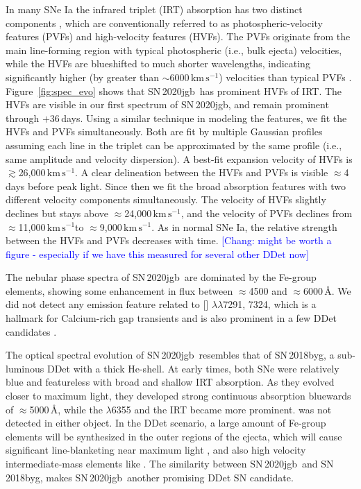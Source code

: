 \documentclass[twocolumn]{aastex631}
\newcommand{\sn}{SN\,2020jgb}
\newcommand{\kms}{$\mathrm{km}\,\mathrm{s}^{-1}$}
\newcommand{\chang}[1]{\textcolor{blue}{[Chang: #1]}}
\begin{document}
In many SNe Ia the  infrared triplet (IRT) absorption has two distinct components \citep{Mazzali_2005}, which are conventionally referred to as photospheric-velocity features (PVFs) and high-velocity features (HVFs). The PVFs originate from the main line-forming region with typical photospheric (i.e., bulk ejecta) velocities, while the HVFs are blueshifted to much shorter wavelengths, indicating significantly higher (by greater than $\sim$6000\,\kms) velocities than typical PVFs \citep{Silverman_HVF_2015}. Figure~\ref{fig:spec_evo} shows that \sn\ has prominent HVFs of  IRT. The HVFs are visible in our first spectrum of \sn, and remain prominent through $+36$\,days. Using a similar technique in modeling the  features, we fit the HVFs and PVFs simultaneously. Both are fit by multiple Gaussian profiles assuming each line in the triplet can be approximated by the same profile (i.e., same amplitude and velocity dispersion). A best-fit expansion velocity of HVFs is $\gtrsim$26,000\,\kms. A clear delineation between the HVFs and PVFs is visible $\approx$4\,days before peak light. Since then we fit the broad absorption features with two different velocity components simultaneously. The velocity of HVFs slightly declines but stays above $\approx$24,000\,\kms, and the velocity of PVFs declines from $\approx$11,000\,\kms to $\approx$9,000\,\kms. As in normal SNe Ia, the relative strength between the HVFs and PVFs decreases with time. \chang{might be worth a figure - especially if we have this measured for several other DDet now}

The nebular phase spectra of \sn\ are dominated by the Fe-group elements, showing some enhancement in flux between $\approx$4500 and $\approx$6000\,\r{A}. We did not detect any emission feature related to [] $\lambda\lambda$7291, 7324, which is a hallmark for Calcium-rich gap transients and is also prominent in a few DDet candidates \citep[e.g., SN\,2016hnk and SN\,2019ofm;][]{De_Ca-rich_2020}. 

The optical spectral evolution of \sn\ resembles that of SN\,2018byg, a sub-luminous DDet with a thick He-shell. At early times, both SNe were relatively blue and featureless with broad and shallow  IRT absorption. As they evolved closer to maximum light, they developed strong continuous absorption bluewards of $\approx$5000\,\r{A}, while the  $\lambda$6355 and the  IRT became more prominent.  was not detected in either object. In the DDet scenario, a large amount of Fe-group elements will be synthesized in the outer regions of the ejecta, which will cause significant line-blanketing near maximum light \citep{Kromer_DD_2010, polin_observational_2019}, and also high velocity intermediate-mass elements like  \citep{Fink_DD_2010, Kromer_DD_2010}. The similarity between \sn\ and SN\,2018byg, makes \sn\ another promising DDet SN candidate. 
\end{document}

